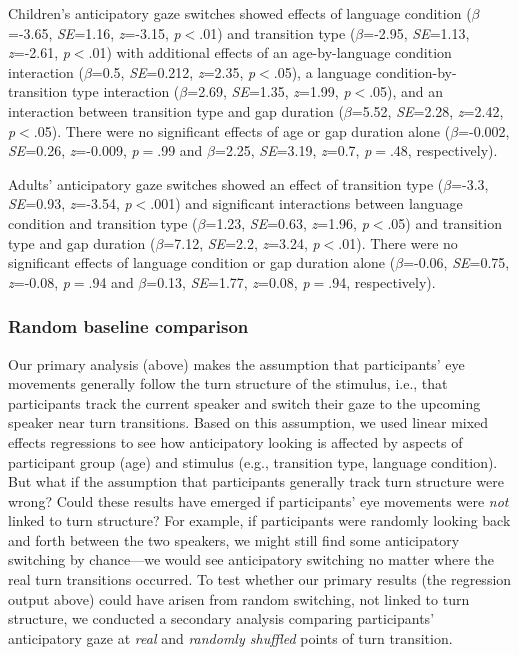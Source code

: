 \documentclass[authoryear, 12pt]{elsarticle}
\begin{document}
Children's anticipatory gaze switches showed effects of language condition (\textit{$\beta$}=-3.65, \textit{SE}=1.16, \textit{z}=-3.15, \textit{p}$<$.01) and transition type (\textit{$\beta$}=-2.95, \textit{SE}=1.13, \textit{z}=-2.61, \textit{p}$<$.01) with additional effects of an age-by-language condition interaction (\textit{$\beta$}=0.5, \textit{SE}=0.212, \textit{z}=2.35, \textit{p}$<$.05), a language condition-by-transition type interaction (\textit{$\beta$}=2.69, \textit{SE}=1.35, \textit{z}=1.99, \textit{p}$<$.05), and an interaction between transition type and gap duration (\textit{$\beta$}=5.52, \textit{SE}=2.28, \textit{z}=2.42, \textit{p}$<$.05). There were no significant effects of age or gap duration alone (\textit{$\beta$}=-0.002, \textit{SE}=0.26, \textit{z}=-0.009, \textit{p}$=$.99 and \textit{$\beta$}=2.25, \textit{SE}=3.19, \textit{z}=0.7, \textit{p}$=$.48, respectively).

Adults' anticipatory gaze switches showed an effect of transition type (\textit{$\beta$}=-3.3, \textit{SE}=0.93, \textit{z}=-3.54, \textit{p}$<$.001) and significant interactions between language condition and transition type (\textit{$\beta$}=1.23, \textit{SE}=0.63, \textit{z}=1.96, \textit{p}$<$.05) and transition type and gap duration (\textit{$\beta$}=7.12, \textit{SE}=2.2, \textit{z}=3.24, \textit{p}$<$.01). There were no significant effects of language condition or gap duration alone (\textit{$\beta$}=-0.06, \textit{SE}=0.75, \textit{z}=-0.08, \textit{p}$=$.94 and \textit{$\beta$}=0.13, \textit{SE}=1.77, \textit{z}=0.08, \textit{p}$=$.94, respectively).


\subsubsection*{Random baseline comparison}
\label{sec:randbaseline1}

Our primary analysis (above) makes the assumption that participants' eye movements generally follow the turn structure of the stimulus, i.e., that participants track the current speaker and switch their gaze to the upcoming speaker near turn transitions. Based on this assumption, we used linear mixed effects regressions to see how anticipatory looking is affected by aspects of participant group (age) and stimulus (e.g., transition type, language condition). But what if the assumption that participants generally track turn structure were wrong? Could these results have emerged if participants' eye movements were \textit{not} linked to turn structure? For example, if participants were randomly looking back and forth between the two speakers, we might still find some anticipatory switching by chance---we would see anticipatory switching no matter where the real turn transitions occurred. To test whether our primary results (the regression output above) could have arisen from random switching, not linked to turn structure, we conducted a secondary analysis comparing participants' anticipatory gaze at \textit{real} and \textit{randomly shuffled} points of turn transition.
\end{document}
